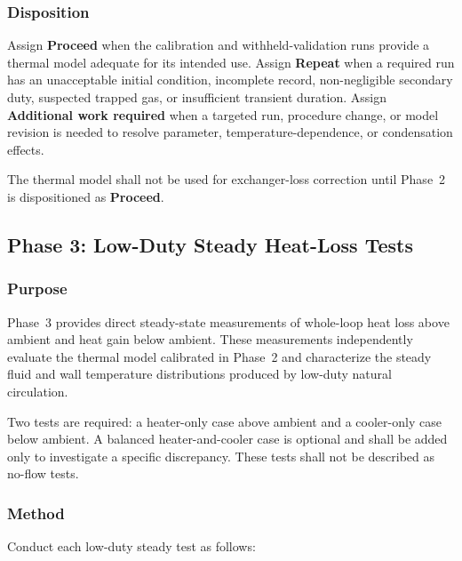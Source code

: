 \documentclass[11pt]{article}
\begin{document}
\subsubsection{Disposition}

Assign \textbf{Proceed} when the calibration and withheld-validation runs provide a thermal model adequate for its intended use. Assign \textbf{Repeat} when a required run has an unacceptable initial condition, incomplete record, non-negligible secondary duty, suspected trapped gas, or insufficient transient duration. Assign \textbf{Additional work required} when a targeted run, procedure change, or model revision is needed to resolve parameter, temperature-dependence, or condensation effects.

The thermal model shall not be used for exchanger-loss correction until Phase~2 is dispositioned as \textbf{Proceed}.

\subsection{Phase 3: Low-Duty Steady Heat-Loss Tests}
\label{sec:low_duty}

\subsubsection{Purpose}

Phase~3 provides direct steady-state measurements of whole-loop heat loss above ambient and heat gain below ambient. These measurements independently evaluate the thermal model calibrated in Phase~2 and characterize the steady fluid and wall temperature distributions produced by low-duty natural circulation.

Two tests are required: a heater-only case above ambient and a cooler-only case below ambient. A balanced heater-and-cooler case is optional and shall be added only to investigate a specific discrepancy. These tests shall not be described as no-flow tests.

\subsubsection{Method}

Conduct each low-duty steady test as follows:
\end{document}
